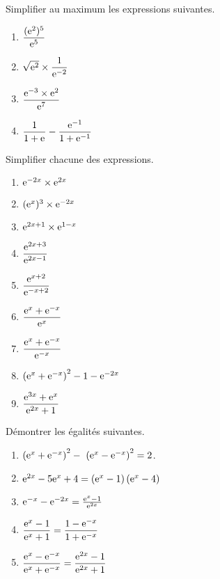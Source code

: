 



 \summary{}
 
	
\begin{exercice}
Simplifier au maximum les expressions suivantes.

\begin{enumerate}
\item $ \dfrac{(\mathrm{e}^{2})^{5}}{\mathrm{e}^{5}}$ 
\item $ \sqrt{\mathrm{e}^{2}} \times\dfrac{1}{\mathrm{e}^{-2}}$
\item $ \dfrac{\mathrm{e}^{-3}\times \mathrm{e}^{2}}{\mathrm{e}^{7} }$

\item  $ \dfrac{1}{1+\mathrm{e}^{}}-\dfrac{\mathrm{e}^{-1}}{1+\mathrm{e}^{-1}}$                                               

\end{enumerate}

  \end{exercice}
  
  \begin{exercice}
Simplifier chacune des expressions.

\begin{enumerate}
\item $ \mathrm{e}^{-2x}\times\mathrm{e}^{2x} $
\item $( \mathrm{e}^{x})^{3}\times\mathrm{e}^{-2x}$ 
\item $  \mathrm{e}^{2x+1}\times\mathrm{e}^{1-x} $
\item  $ \dfrac{\mathrm{e}^{2x+3}}{\mathrm{e}^{2x-1}} $                                               
\item $\dfrac{\mathrm{e}^{x+2}}{\mathrm{e}^{-x+2}}  $
\item $ \dfrac{\mathrm{e}^{x}+\mathrm{e}^{-x}}{\mathrm{e}^{x}} $
\item $ \dfrac{\mathrm{e}^{x}+\mathrm{e}^{-x}}{\mathrm{e}^{-x}} $
\item $\left(\mathrm{e}^{x}+\mathrm{e}^{-x}\right)^{2}-1-\mathrm{e}^{-2x}$
\item  $ \dfrac{\mathrm{e}^{3x}+\mathrm{e}^{x}}{\mathrm{e}^{2x}+1} $ 
\end{enumerate}


  \end{exercice}
  
  
  \begin{exercice}
Démontrer les égalités suivantes.
\begin{enumerate}
\item $\left(\mathrm{e}^{x}+\mathrm{e}^{-x}\right)^{2}-~\left(\mathrm{e}^{x}-\mathrm{e}^{-x}\right)^{2}=2$.
\item $ \mathrm{e}^{2x}-5\mathrm{e}^{x}+4= \left(\mathrm{e}^{x}-1\right)\left(\mathrm{e}^{x}-4\right)$
\item $ \mathrm{e}^{-x}-\mathrm{e}^{-2x}=\frac{\mathrm{e}^{x}-1}{\mathrm{e}^{2x}} $
\item $ \dfrac{\mathrm{e}^{x}-1}{\mathrm{e}^{x}+1}= \dfrac{1-\mathrm{e}^{-x}}{1+\mathrm{e}^{-x}}$
\item $  \dfrac{\mathrm{e}^{x}-\mathrm{e}^{-x}}{\mathrm{e}^{x}+\mathrm{e}^{-x}} =\dfrac{\mathrm{e}^{2x}-1}{\mathrm{e}^{2x}+1}$
\end{enumerate}


  \end{exercice}
  
